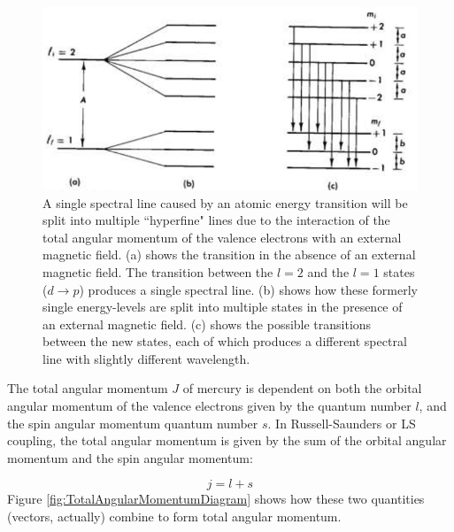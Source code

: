 \documentclass[twocolumn]{article}
\begin{document}
		\begin{figure}
			\centering
			\includegraphics[width=1.0\linewidth]{Images/SpectralSplitting}
			\caption{A single spectral line caused by an atomic energy transition will be split into multiple ``hyperfine" lines due to the interaction of the total angular momentum of the valence electrons with an external magnetic field. (a) shows the transition in the absence of an external magnetic field. The transition between the $l=2$ and the $l=1$ states ($d\rightarrow p$) produces a single spectral line. (b) shows how these formerly single energy-levels are split into multiple states in the presence of an external magnetic field. (c) shows the possible transitions between the new states, each of which produces a different spectral line with slightly different wavelength.}
			\label{fig:SpectralSplitting}
		\end{figure}

		The total angular momentum $J$ of mercury is dependent on both the orbital angular momentum of the valence electrons given by the quantum number $l$, and the spin angular momentum quantum number $s$.
		In Russell-Saunders or LS coupling, the total angular momentum is given by the sum of the orbital angular momentum and the spin angular momentum:
		
		\begin{equation}
			j = l + s
			\label{eq:TotalAngularP}
		\end{equation}
		Figure \ref{fig:TotalAngularMomentumDiagram} shows how these two quantities (vectors, actually) combine to form total angular momentum.
		
\end{document}
